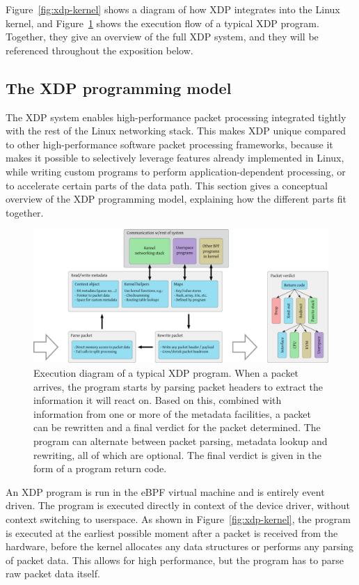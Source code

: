 \documentclass[10pt,sigconf]{acmart}
\begin{document}
Figure~\ref{fig:xdp-kernel} shows a diagram of how XDP integrates into the Linux
kernel, and Figure~\ref{fig:xdp-execution} shows the execution flow of a typical
XDP program. Together, they give an overview of the full XDP system, and they
will be referenced throughout the exposition below.

\subsection{The XDP programming model}
\label{sec:prog-model}
The XDP system enables high-performance packet processing integrated tightly
with the rest of the Linux networking stack. This makes XDP unique compared to
other high-performance software packet processing frameworks, because it makes
it possible to selectively leverage features already implemented in Linux, while
writing custom programs to perform application-dependent processing, or to
accelerate certain parts of the data path. This section gives a conceptual
overview of the XDP programming model, explaining how the different parts fit
together.

\begin{figure}[t]
\centering
\includegraphics[width=\linewidth]{figures/xdp-execution-diagram.pdf}
\caption{\label{fig:xdp-execution} Execution diagram of a typical XDP program.
  When a packet arrives, the program starts by parsing packet headers to extract
  the information it will react on. Based on this, combined with information
  from one or more of the metadata facilities, a packet can be rewritten and a
  final verdict for the packet determined. The program can alternate between
  packet parsing, metadata lookup and rewriting, all of which are optional. The
  final verdict is given in the form of a program return code.}
\end{figure}


An XDP program is run in the eBPF virtual machine and is entirely event driven.
The program is executed directly in context of the device driver, without
context switching to userspace. As shown in Figure~\ref{fig:xdp-kernel}, the
program is executed at the earliest possible moment after a packet is received
from the hardware, before the kernel allocates any data structures or performs
any parsing of packet data. This allows for high performance, but the program
has to parse raw packet data itself.
\end{document}
